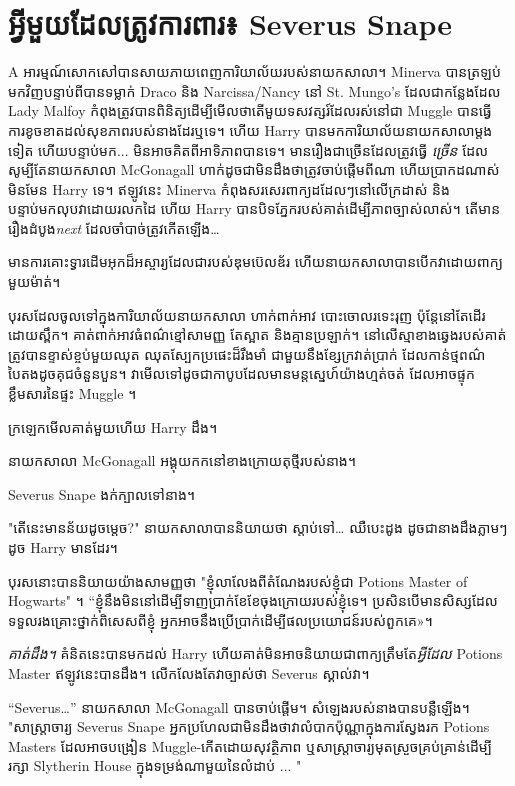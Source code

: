 \chapter{អ្វីមួយដែលត្រូវការពារ៖ Severus Snape}

\lettrine{A}{} អារម្មណ៍សោកសៅបានសាយភាយពេញការិយាល័យរបស់នាយកសាលា។ Minerva បានត្រឡប់មកវិញបន្ទាប់ពីបានទម្លាក់ Draco និង Narcissa/Nancy នៅ St. Mungo's ដែលជាកន្លែងដែល Lady Malfoy កំពុងត្រូវបានពិនិត្យដើម្បីមើលថាតើមួយទសវត្សរ៍ដែលរស់នៅជា Muggle បានធ្វើការខូចខាតដល់សុខភាពរបស់នាងដែរឬទេ។ ហើយ Harry បានមកការិយាល័យនាយកសាលាម្តងទៀត ហើយបន្ទាប់មក... មិនអាចគិតពីអាទិភាពបានទេ។ មានរឿងជាច្រើនដែលត្រូវធ្វើ \emph{ច្រើន} ដែលសូម្បីតែនាយកសាលា McGonagall ហាក់ដូចជាមិនដឹងថាត្រូវចាប់ផ្តើមពីណា ហើយប្រាកដណាស់មិនមែន Harry ទេ។ ឥឡូវនេះ Minerva កំពុងសរសេរពាក្យដដែលៗនៅលើក្រដាស់ និងបន្ទាប់មកលុបវាដោយរលកដៃ ហើយ Harry បានបិទភ្នែករបស់គាត់ដើម្បីភាពច្បាស់លាស់។ តើមានរឿងដំបូង\emph{next} ដែលចាំបាច់ត្រូវកើតឡើង…

មាន​ការ​គោះ​ទ្វារ​ដើម​អុក​ដ៏​អស្ចារ្យ​ដែល​ជា​របស់​ឌុម​ប៊េល​ឌ័រ ហើយ​នាយក​សាលា​បាន​បើក​វា​ដោយ​ពាក្យ​មួយ​ម៉ាត់។

បុរស​ដែល​ចូល​ទៅ​ក្នុង​ការិយាល័យ​នាយក​សាលា ហាក់​ពាក់​អាវ បោះ​ចោល​រទេះ​រុញ ប៉ុន្តែ​នៅ​តែ​ដើរ​ដោយ​ស្ពឹក។ គាត់​ពាក់​អាវ​ធំ​ពណ៌​ខ្មៅ​សាមញ្ញ តែ​ស្អាត និង​គ្មាន​ប្រឡាក់។ នៅលើស្មាខាងឆ្វេងរបស់គាត់ត្រូវបានខ្ទាស់ខ្ចប់មួយឈុត ឈុតស្បែកប្រផេះដ៏រឹងមាំ ជាមួយនឹងខ្សែក្រវាត់ប្រាក់ ដែលកាន់ថ្មពណ៌បៃតងដូចគុជចំនួនបួន។ វាមើលទៅដូចជាកាបូបដែលមានមន្តស្នេហ៍យ៉ាងហ្មត់ចត់ ដែលអាចផ្ទុកខ្លឹមសារនៃផ្ទះ Muggle ។

ក្រឡេកមើលគាត់មួយហើយ Harry ដឹង។

នាយកសាលា McGonagall អង្គុយកកនៅខាងក្រោយតុថ្មីរបស់នាង។

Severus Snape ងក់ក្បាលទៅនាង។

"តើនេះមានន័យដូចម្តេច?" នាយកសាលាបាននិយាយថា ស្តាប់ទៅ… ឈឺបេះដូង ដូចជានាងដឹងភ្លាមៗ ដូច Harry មានដែរ។

បុរសនោះបាននិយាយយ៉ាងសាមញ្ញថា "ខ្ញុំលាលែងពីតំណែងរបស់ខ្ញុំជា Potions Master of Hogwarts" ។ “ខ្ញុំនឹងមិននៅដើម្បីទាញប្រាក់ខែខែចុងក្រោយរបស់ខ្ញុំទេ។ ប្រសិន​បើ​មាន​សិស្ស​ដែល​ទទួល​រង​គ្រោះ​ថ្នាក់​ពិសេស​ពី​ខ្ញុំ អ្នក​អាច​នឹង​ប្រើ​ប្រាក់​ដើម្បី​ផល​ប្រយោជន៍​របស់​ពួកគេ»។

\emph{គាត់ដឹង។} គំនិតនេះបានមកដល់ Harry ហើយគាត់មិនអាចនិយាយជាពាក្យត្រឹមតែ\emph{អ្វីដែល} Potions Master ឥឡូវនេះបានដឹង។ លើកលែងតែវាច្បាស់ថា Severus ស្គាល់វា។

“Severus…” នាយកសាលា McGonagall បានចាប់ផ្តើម។ សំឡេងរបស់នាងបានបន្លឺឡើង។ "សាស្រ្តាចារ្យ Severus Snape អ្នកប្រហែលជាមិនដឹងថាវាលំបាកប៉ុណ្ណាក្នុងការស្វែងរក Potions Masters ដែលអាចបង្រៀន Muggle-កើតដោយសុវត្ថិភាព ឬសាស្រ្តាចារ្យមុតស្រួចគ្រប់គ្រាន់ដើម្បីរក្សា Slytherin House ក្នុងទម្រង់ណាមួយនៃលំដាប់ ... "

